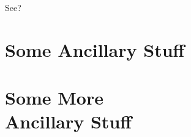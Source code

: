 \documentclass[12pt,econ]{article}
\begin{document}
See?

\appendix

\section{Some Ancillary Stuff}


\section{Some More\\Ancillary Stuff}



\ssp                           %
\nocite{*}
\end{document}
